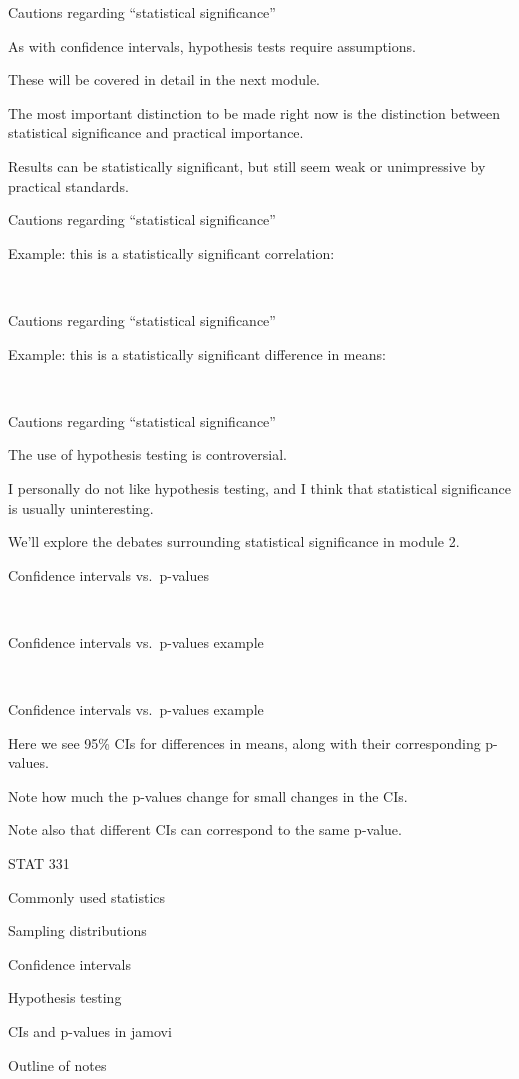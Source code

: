 \documentclass[
  letterpaper,
  DIV=11,
  numbers=noendperiod]{scrreprt}
\begin{document}
Cautions regarding ``statistical significance''

As with confidence intervals, hypothesis tests require assumptions.

These will be covered in detail in the next module.

The most important distinction to be made right now is the distinction
between statistical significance and practical importance.

Results can be statistically significant, but still seem weak or
unimpressive by practical standards.

Cautions regarding ``statistical significance''

Example: this is a statistically significant correlation:

~

Cautions regarding ``statistical significance''

Example: this is a statistically significant difference in means:

~

Cautions regarding ``statistical significance''

The use of hypothesis testing is controversial.

I personally do not like hypothesis testing, and I think that
statistical significance is usually uninteresting.

We'll explore the debates surrounding statistical significance in module
2.

Confidence intervals vs.~p-values

~

Confidence intervals vs.~p-values example

~

Confidence intervals vs.~p-values example

Here we see 95\% CIs for differences in means, along with their
corresponding p-values.

Note how much the p-values change for small changes in the CIs.

Note also that different CIs can correspond to the same p-value.

STAT 331

Commonly used statistics

Sampling distributions

Confidence intervals

Hypothesis testing

CIs and p-values in jamovi

Outline of notes
\end{document}
